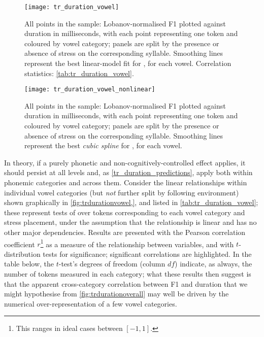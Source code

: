 \begin{figure}[H]
  \centering
  \texttt{[image: tr\_duration\_vowel]}
  \caption[Duration plotted against F1, linear fit by vowel category.]{All points in the sample: Lobanov-normalised F1 plotted against duration in milliseconds, with each point representing one token and coloured by vowel category; panels are split by the presence or absence of stress on the corresponding syllable. Smoothing lines represent the best linear-model fit for , for each vowel. Correlation statistics: \cref{tab:tr_duration_vowel}.}
  \label{fig:trdurationvowel}
\end{figure}

\begin{figure}[H]
  \centering
  \texttt{[image: tr\_duration\_vowel\_nonlinear]}
  \caption[Duration plotted against F1, cubic spline fit by vowel category.]{All points in the sample: Lobanov-normalised F1 plotted against duration in milliseconds, with each point representing one token and coloured by vowel category; panels are split by the presence or absence of stress on the corresponding syllable. Smoothing lines represent the best \textit{cubic spline} for , for each vowel.}
  \label{fig:trdurationvowel_nonlinear}
\end{figure}

In theory, if a purely phonetic and non-cognitively-controlled effect applies, it should persist at all levels and, as \cref{tr_duration_predictions}, apply both within phonemic categories and across them. Consider the linear relationships within individual vowel categories (but \emph{not} further split by following environment) shown graphically in \cref{fig:trdurationvowel,}, and listed in \cref{tab:tr_duration_vowel}; these represent tests of  over tokens corresponding to each vowel category and stress placement, under the assumption that the relationship is linear and has no other major dependencies. Results are presented with the Pearson correlation coefficient $r$\footnote{This ranges in ideal cases between $[-1, 1]$.} as a measure of the relationship between variables, and with $t$-distribution tests for significance; significant correlations are highlighted. In the table below, the $t$-test's degrees of freedom (column $df$) indicate, as always, the number of tokens measured in each category; what these results then suggest is that the apparent cross-category correlation between F1 and duration that we might hypothesise from \cref{fig:trdurationoverall} may well be driven by the numerical over-representation of a few vowel categories.

